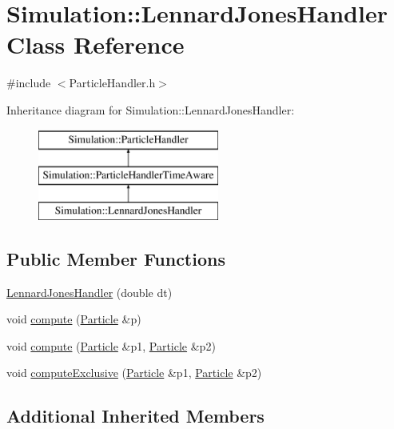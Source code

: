 \hypertarget{classSimulation_1_1LennardJonesHandler}{\section{Simulation\-:\-:Lennard\-Jones\-Handler Class Reference}
\label{classSimulation_1_1LennardJonesHandler}
}


{\ttfamily \#include $<$Particle\-Handler.\-h$>$}

Inheritance diagram for Simulation\-:\-:Lennard\-Jones\-Handler\-:\begin{figure}[H]
\begin{center}
\leavevmode
\includegraphics[height=3.000000cm]{classSimulation_1_1LennardJonesHandler}
\end{center}
\end{figure}
\subsection*{Public Member Functions}
\begin{DoxyCompactItemize}
\item 
\hyperlink{classSimulation_1_1LennardJonesHandler_a1eea638f715656e842824a9f9fa56a01}{Lennard\-Jones\-Handler} (double dt)
\item 
void \hyperlink{classSimulation_1_1LennardJonesHandler_aa2a7d4ce850ece69663918a7cfc4072f}{compute} (\hyperlink{classSimulation_1_1Particle}{Particle} \&p)
\item 
void \hyperlink{classSimulation_1_1LennardJonesHandler_a81842168e68a61cb75448f91bc27f99c}{compute} (\hyperlink{classSimulation_1_1Particle}{Particle} \&p1, \hyperlink{classSimulation_1_1Particle}{Particle} \&p2)
\item 
void \hyperlink{classSimulation_1_1LennardJonesHandler_ac16127a588f6e8598dc2598d1224517f}{compute\-Exclusive} (\hyperlink{classSimulation_1_1Particle}{Particle} \&p1, \hyperlink{classSimulation_1_1Particle}{Particle} \&p2)
\end{DoxyCompactItemize}
\subsection*{Additional Inherited Members}


